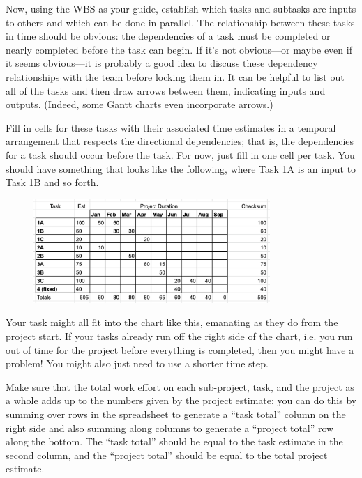 \documentclass[12pt,oneside]{book}
\begin{document}
Now, using the WBS as your guide, establish which tasks and subtasks are inputs to others and which can be done in parallel. The relationship between these tasks in time should be obvious: the dependencies of a task must be completed or nearly completed before the task can begin. If it's not obvious---or maybe even if it seems obvious---it is probably a good idea to discuss these dependency relationships with the team before locking them in. It can be helpful to list out all of the tasks and then draw arrows between them, indicating inputs and outputs. (Indeed, some Gantt charts even incorporate arrows.)

Fill in cells for these tasks with their associated time estimates in a temporal arrangement that respects the directional dependencies; that is, the dependencies for a task should occur before the task. For now, just fill in one cell per task. You should have something that looks like the following, where Task 1A is an input to Task 1B and so forth.

\begin{figure}[h]
\centering
\includegraphics[width=0.8\textwidth]{Plan_01.png}
\centering
\end{figure}
\break
Your task might all fit into the chart like this, emanating as they do from the project start. If your tasks already run off the right side of the chart, i.e. you run out of time for the project before everything is completed, then you might have a problem! You might also just need to use a shorter time step.
	
Make sure that the total work effort on each sub-project, task, and the project as a whole adds up to the numbers given by the project estimate; you can do this by summing over rows in the spreadsheet to generate a ``task total'' column on the right side and also summing along columns to generate a ``project total'' row along the bottom. The ``task total'' should be equal to the task estimate in the second column, and the ``project total'' should be equal to the total project estimate.
\end{document}
